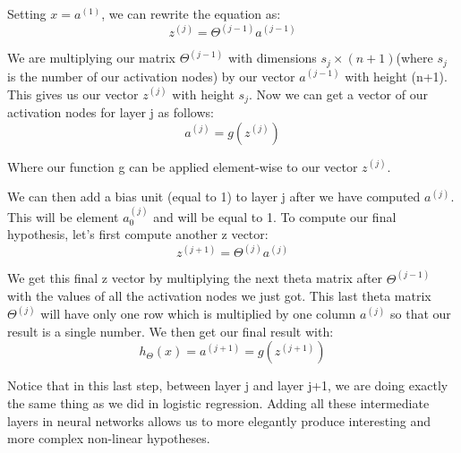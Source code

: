 \documentclass{article}
\begin{document}
Setting $x = a^{(1)}$, we can rewrite the equation as:
$$z^{(j)} = \Theta^{(j-1)}a^{(j-1)}$$

We are multiplying our matrix $\Theta^{(j-1)}$ with dimensions $s_j\times (n+1)$(where $s_j$ is the number of our activation nodes) by our vector $a^{(j-1)}$ with height (n+1). This gives us our vector $z^{(j)}$ with height $s_j$. Now we can get a vector of our activation nodes for layer j as follows: 
$$a^{(j)} = g(z^{(j)})$$

Where our function g can be applied element-wise to our vector $z^{(j)}$.

We can then add a bias unit (equal to 1) to layer j after we have computed $a^{(j)}$. This will be element $a_0^{(j)}$ and will be equal to 1. To compute our final hypothesis, let's first compute another z vector:
$$z^{(j+1)} = \Theta^{(j)}a^{(j)}$$

We get this final z vector by multiplying the next theta matrix after $\Theta^{(j-1)}$ with the values of all the activation nodes we just got. This last theta matrix $\Theta^{(j)}$ will have only one row which is multiplied by one column $a^{(j)}$ so that our result is a single number. We then get our final result with:
$$h_\Theta(x) = a^{(j+1)} = g(z^{(j+1)})$$

Notice that in this last step, between layer j and layer j+1, we are doing exactly the same thing as we did in logistic regression. Adding all these intermediate layers in neural networks allows us to more elegantly produce interesting and more complex non-linear hypotheses.
\end{document}
